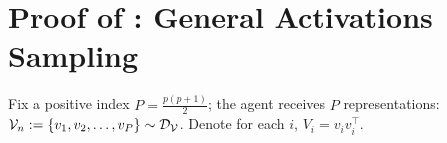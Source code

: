 
\section{Proof of : General Activations Sampling}\label{app: samplegeneral}

    
    \iffalse
    Fix a positive index $P = \frac{p(p+1)}{2}$; the agent receives $P$ representations: ${\mathcal{V}}_n := \{v_1,v_2,\ldots, v_{P}\} \sim {\mathcal{D}}_{{\mathcal{V}}}$. Denote for each $i$, $V_i = v_iv_i^{\top}$.
    
